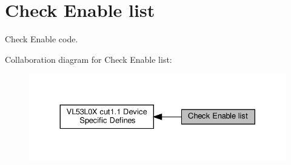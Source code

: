 \hypertarget{group__VL53L0X__CheckEnable__group}{}\section{Check Enable list}
\label{group__VL53L0X__CheckEnable__group}


Check Enable code.  


Collaboration diagram for Check Enable list\+:\nopagebreak
\begin{figure}[H]
\begin{center}
\leavevmode
\includegraphics[width=330pt]{group__VL53L0X__CheckEnable__group}
\end{center}
\end{figure}
